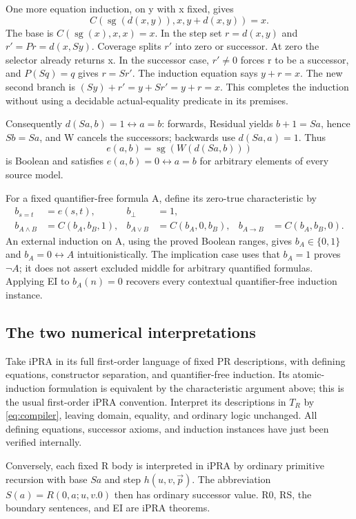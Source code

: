 \documentclass[11pt,letterpaper]{article}
\theoremstyle{definition}\newtheorem{definition}[theorem]{Definition}
\theoremstyle{remark}\newtheorem{remark}[theorem]{Remark}
\begin{document}
One more equation induction, on y with x fixed, gives
\[
        C(\operatorname{sg}(d(x,y)),x,y+d(x,y))=x. \tag{Residual}
\]
The base is $C(\operatorname{sg}(x),x,x)=x$. In the step set
$r=d(x,y)$ and $r'=Pr=d(x,Sy)$. Coverage splits $r'$ into zero
or successor. At zero the selector already returns x. In the successor
case, $r'\ne0$ forces r to be a successor, and $P(Sq)=q$ gives
$r=Sr'$. The induction equation says $y+r=x$. The new second branch
is $(Sy)+r'=y+Sr'=y+r=x$. This completes the induction without
using a decidable actual-equality predicate in its premises.

Consequently $d(Sa,b)=1\leftrightarrow a=b$: forwards, Residual yields
$b+1=Sa$, hence $Sb=Sa$, and W cancels the successors; backwards
use $d(Sa,a)=1$. Thus
\[
                 e(a,b)=\operatorname{sg}(W(d(Sa,b)))
\]
is Boolean and satisfies $e(a,b)=0\leftrightarrow a=b$ for arbitrary
elements of every source model.

For a fixed quantifier-free formula A, define its zero-true
characteristic by
\begin{align*}
 b_{s=t}&=e(s,t),&b_\bot&=1,\\
 b_{A\wedge B}&=C(b_A,b_B,1),&
 b_{A\vee B}&=C(b_A,0,b_B),&
 b_{A\to B}&=C(b_A,b_B,0).
\end{align*}
An external induction on A, using the proved Boolean ranges, gives
$b_A\in\{0,1\}$ and $b_A=0\leftrightarrow A$ intuitionistically.
The implication case uses that $b_A=1$ proves $\neg A$; it does not
assert excluded middle for arbitrary quantified formulas. Applying EI
to $b_A(n)=0$ recovers every contextual quantifier-free induction instance.

\subsection{The two numerical interpretations}

Take iPRA in its full first-order language of fixed PR descriptions,
with defining equations, constructor separation, and quantifier-free
induction. Its atomic-induction formulation is equivalent by the
characteristic argument above; this is the usual first-order iPRA
convention\cite{salehi}. Interpret its descriptions in $T_R$ by
\eqref{eq:compiler}, leaving domain, equality, and ordinary logic unchanged.
All defining equations, successor axioms, and induction instances have
just been verified internally.

Conversely, each fixed R body is interpreted in iPRA by ordinary
primitive recursion with base $Sa$ and step $h(u,v,\vec p)$. The
abbreviation $S(a)=R(0,a;u,v.0)$ then has ordinary successor value.
R0, RS, the boundary sentences, and EI are iPRA theorems.
\end{document}

